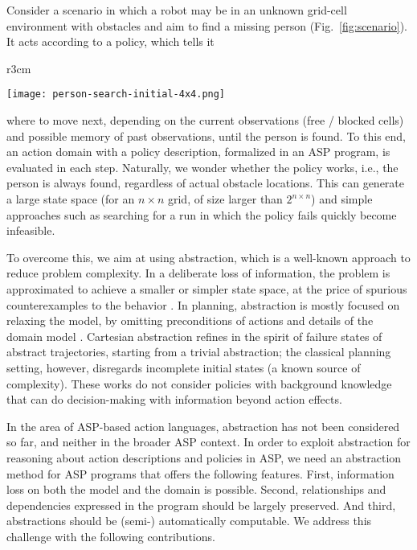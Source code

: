 \documentclass{new_tlp}
\begin{document}
Consider a scenario in which a robot may be in an unknown grid-cell environment with
obstacles and aim to find a missing person (Fig.~\ref{fig:scenario}). 
It acts according to a policy, which tells it
%
\begin{wrapfigure}{r}{3cm}

\centering

\vspace*{-.5\baselineskip}

\texttt{[image: person-search-initial-4x4.png]}

\vspace*{-.5\baselineskip}

\caption{\quad Missing person search in an unkown environment}
\label{fig:scenario}
\vspace*{-\baselineskip}

\end{wrapfigure}
%
where to move next,
depending on the current observations (free / blocked cells) and
possible memory of past observations, until the person is found. To
this end, an action domain with a policy description, formalized in an
ASP program, is evaluated in each step. 
Naturally, we wonder whether the policy works, i.e.,
the person is always found, regardless of actual obstacle
locations. This can generate a large state space (for an $n{\times}n$
grid, of size larger than $2^{n{\times}n}$) and simple approaches such
as searching for a run in which the policy fails
quickly become infeasible.

To overcome this, we aim at using abstraction, which is a well-known
approach to reduce problem complexity. In a deliberate loss of
information, the problem is approximated to achieve a smaller or
simpler state space, at the price of spurious
counterexamples to the behavior \cite{clarke03}. In planning, abstraction
is mostly focused on relaxing the model, by omitting preconditions of
actions and details of the domain model
\cite{giunchiglia1992theory,knoblock1994automatically,sacerdoti1974planning}.
Cartesian abstraction \cite{seipp2013counterexample} refines
in the spirit of \cite{clarke03} failure states of abstract
trajectories, starting from a trivial abstraction; the classical
planning setting, however, disregards incomplete
initial states
(a known source of complexity).
These works do not consider policies with background knowledge that can do decision-making with information beyond action effects.

In the area of ASP-based action languages, abstraction has not been
considered so far, and neither in the broader ASP context.
In order to exploit abstraction for reasoning about action
descriptions and policies in ASP, we need an abstraction method for
ASP programs that offers the following features. First, information
loss on both the model and the domain is possible. Second, 
relationships and dependencies expressed in the program should be
largely preserved. And third, abstractions should be (semi-)
automatically computable. We address this challenge with the
following contributions.
\end{document}
